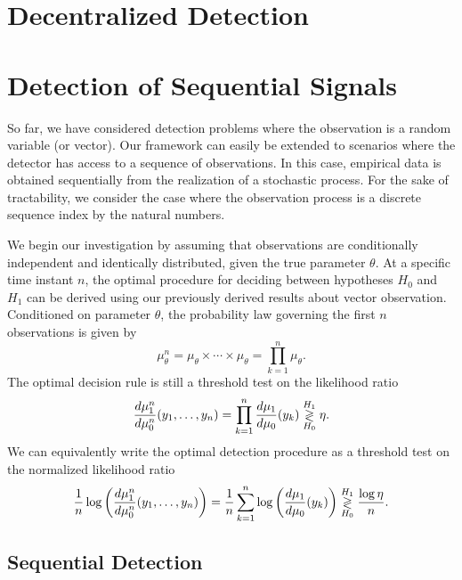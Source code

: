 \section{Decentralized Detection}

\newpage

\section{Detection of Sequential Signals}

So far, we have considered detection problems where the observation is a random variable (or vector).
Our framework can easily be extended to scenarios where the detector has access to a sequence of observations.
In this case, empirical data is obtained sequentially from the realization of a stochastic process.
For the sake of tractability, we consider the case where the observation process is a discrete sequence index by the natural numbers.

We begin our investigation by assuming that observations are conditionally independent and identically distributed, given the true parameter $\theta$.
At a specific time instant $n$, the optimal procedure for deciding between hypotheses $H_0$ and $H_1$ can be derived using our previously derived results about vector observation.
Conditioned on parameter $\theta$, the probability law governing the first $n$ observations is given by
\begin{equation*}
\mu_{\theta}^n = \mu_{\theta} \times \cdots \times \mu_{\theta}
= \prod_{k=1}^n \mu_{\theta} .
\end{equation*}
The optimal decision rule is still a threshold test on the likelihood ratio
\begin{equation*}
\frac{d\mu_1^n}{d\mu_0^n} (y_1, \ldots, y_n)
= \prod_{k=1}^n \frac{d\mu_1}{d\mu_0}(y_k)
\overset{H_1}{ \underset{H_0}{\gtrless} } \eta .
\end{equation*}
We can equivalently write the optimal detection procedure as a threshold test on the normalized likelihood ratio
\begin{equation*}
\frac{1}{n} \log \left( \frac{d\mu_1^n}{d\mu_0^n} (y_1, \ldots, y_n) \right)
= \frac{1}{n} \sum_{k=1}^n \log \left( \frac{d\mu_1}{d\mu_0}(y_k) \right)
\overset{H_1}{ \underset{H_0}{\gtrless} } \frac{ \log \eta }{n} .
\end{equation*}

\subsection{Sequential Detection}
